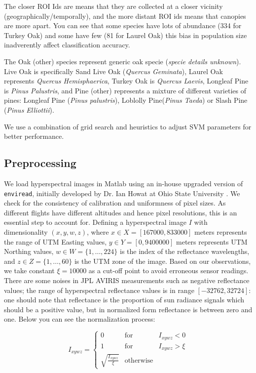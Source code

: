 \documentclass[remotesensing,article,accept,moreauthors,pdftex,12pt,a4paper]{mdpi}
\begin{document}
The closer ROI Ids are means that they are collected at a closer vicinity (geographically/temporally), and the more distant ROI ids means that canopies are more apart. 
You can see that some species have lots of abundance (334 for Turkey Oak) and some have few (81 for Laurel Oak) this bias in population size inadverently affect classification accuracy.

The Oak  (other) species represent generic oak specie (\textit{specie details unknown}). Live Oak is specifically Sand Live Oak (\textit{Quercus Geminata}), Laurel Oak represents \textit{Quercus Hemisphaerica}, Turkey Oak is \textit{Quercus Laevis}, Longleaf Pine is \textit{Pinus Palustris}, and Pine (other) represents a mixture of different varieties of pines:  Longleaf Pine (\textit{Pinus palustris}), Loblolly Pine(\textit{Pinus Taeda}) or Slash Pine (\textit{Pinus Elliottii}).

We use a combination of grid search and heuristics to adjust SVM parameters for better performance.

\subsection{Preprocessing}

We load hyperspectral images in Matlab using an in-house upgraded version of \texttt{enviread}, initially developed by Dr. Ian Howat at Ohio State University \cite{howat2007enviread}. 
We check for the consistency of calibration and uniformness of pixel sizes. 
As different flights have different altitudes and hence pixel resolutions, this is an essential step to account for. 
Defining a hyperspectral image $I$ with dimensionality $(x,y,w,z)$, where $x \in X = [167000, 833000 ]$ meters represents the range of UTM Easting values, $y \in Y = [0, 9400000]$ meters represents UTM Northing values, $w \in W = \{1, \dotsc, 224\}$ is the index of the reflectance wavelengths, and $z \in Z = \{1, \dotsc, 60 \}$ is the UTM zone of the image. 
Based on our observations, we take constant $\xi = 10000$ as a cut-off point to avoid erroneous sensor readings. 
There are some noises in JPL AVIRIS measurements such as negative reflectance values; 
the range of hyperspectral reflectance values is in range $[-32762, 32724]$: one should note that reflectance is the proportion of sun radiance signals which should be a positive value, but in normalized form reflectance is between zero and one. Below you can see the normalization process:

\begin{equation}
I_{xywz} = \left\{ \begin{array}{rcl}
0 & \mbox{for} & I_{xywz} < 0 \\ 
1 & \mbox{for} & I_{xywz} > \xi \\
\sqrt{\frac{I_{xywz}}{\xi}} & \mbox{otherwise} & 
\end{array}\right.
\end{equation}
\end{document}

